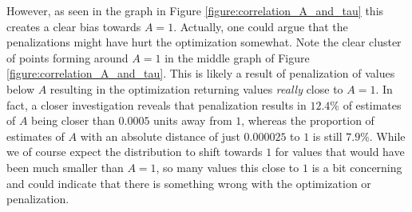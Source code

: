However, as seen in the graph in Figure \ref{figure:correlation_A_and_tau} this creates a clear bias towards $A = 1$. Actually, one could argue that the penalizations might have hurt the optimization somewhat. Note the clear cluster of points forming around $A = 1$ in the middle graph of Figure \ref{figure:correlation_A_and_tau}. This is likely a result of penalization of values below $A$ resulting in the optimization returning values \textit{really} close to $A = 1$. In fact, a closer investigation reveals that penalization results in $12.4\%$ of estimates of $A$ being closer than $0.0005$ units away from $1$, whereas the proportion of estimates of $A$ with an absolute distance of just $0.000025$ to $1$ is still $7.9\%$. While we of course expect the distribution to shift towards $1$ for values that would have been much smaller than $A = 1$, so many values this close to $1$ is a bit concerning and could indicate that there is something wrong with the optimization or penalization. 

